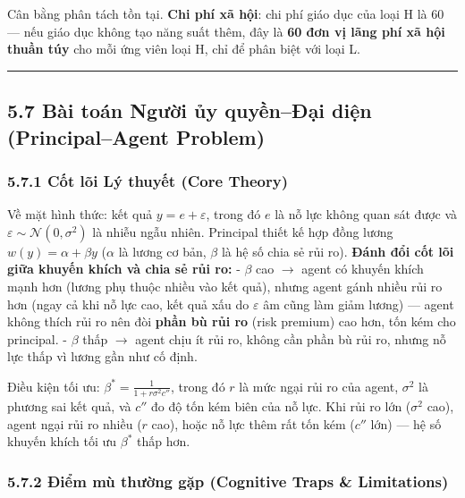 \documentclass[
]{article}
\begin{document}
Cân bằng phân tách tồn tại. \textbf{Chi phí xã hội}: chi phí giáo dục
của loại H là 60 --- nếu giáo dục không tạo năng suất thêm, đây là
\textbf{60 đơn vị lãng phí xã hội thuần túy} cho mỗi ứng viên loại H,
chỉ để phân biệt với loại L.

\begin{center}\rule{0.5\linewidth}{0.5pt}\end{center}

\subsection{5.7 Bài toán Người ủy quyền--Đại diện (Principal--Agent
Problem)}\label{buxe0i-touxe1n-ngux1b0ux1eddi-ux1ee7y-quyux1ec1nux111ux1ea1i-diux1ec7n-principalagent-problem}

\subsubsection{5.7.1 Cốt lõi Lý thuyết (Core
Theory)}\label{cux1ed1t-luxf5i-luxfd-thuyux1ebft-core-theory-7}

Về mặt hình thức: kết quả \(y = e + \varepsilon\), trong đó \(e\) là nỗ
lực không quan sát được và \(\varepsilon \sim \mathcal{N}(0, \sigma^2)\)
là nhiễu ngẫu nhiên. Principal thiết kế hợp đồng lương
\(w(y) = \alpha + \beta y\) (\(\alpha\) là lương cơ bản, \(\beta\) là hệ
số chia sẻ rủi ro). \textbf{Đánh đổi cốt lõi giữa khuyến khích và chia
sẻ rủi ro:} - \(\beta\) cao \(\rightarrow\) agent có khuyến khích mạnh
hơn (lương phụ thuộc nhiều vào kết quả), nhưng agent gánh nhiều rủi ro
hơn (ngay cả khi nỗ lực cao, kết quả xấu do \(\varepsilon\) âm cũng làm
giảm lương) --- agent không thích rủi ro nên đòi \textbf{phần bù rủi ro}
(risk premium) cao hơn, tốn kém cho principal. - \(\beta\) thấp
\(\rightarrow\) agent chịu ít rủi ro, không cần phần bù rủi ro, nhưng nỗ
lực thấp vì lương gần như cố định.

Điều kiện tối ưu: \(\beta^* = \frac{1}{1 + r\sigma^2 c''}\), trong đó
\(r\) là mức ngại rủi ro của agent, \(\sigma^2\) là phương sai kết quả,
và \(c''\) đo độ tốn kém biên của nỗ lực. Khi rủi ro lớn (\(\sigma^2\)
cao), agent ngại rủi ro nhiều (\(r\) cao), hoặc nỗ lực thêm rất tốn kém
(\(c''\) lớn) --- hệ số khuyến khích tối ưu \(\beta^*\) thấp hơn.

\subsubsection{5.7.2 Điểm mù thường gặp (Cognitive Traps \&
Limitations)}\label{ux111iux1ec3m-muxf9-thux1b0ux1eddng-gux1eb7p-cognitive-traps-limitations-13}
\end{document}
